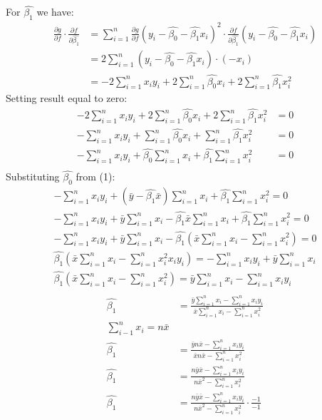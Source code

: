\documentclass{article}
\begin{document}
For $\hat{\beta_1}$ we have:
\begin{align*}
\frac{\partial g}{\partial f}\cdot\frac{\partial f} {\partial \hat{\beta_1}} & = 
\sum_{i=1}^{n} \frac{\partial g}{\partial f} (y_i - \hat{\beta_{0}} - \hat{\beta_{1}}x_i)^2 \cdot \frac{\partial f} {\partial \hat{\beta_1}} (y_i - \hat{\beta_{0}} - \hat{\beta_{1}}x_i) \\
& = 2 \sum_{i=1}^{n} (y_i - \hat{\beta_{0}} - \hat{\beta_{1}}x_i) \cdot 
(-x_i) \\
& =  -2\sum_{i=1}^{n}x_i y_i + 2\sum_{i=1}^{n}\hat{\beta_{0}}x_i + 2\sum_{i=1}^{n}\hat{\beta_{1}}x_i^2
\end{align*}
Setting result equal to zero:
\begin{align*}
-2\sum_{i=1}^{n}x_i y_i + 2\sum_{i=1}^{n}\hat{\beta_{0}}x_i + 2\sum_{i=1}^{n}\hat{\beta_{1}}x_i^2 & = 0 \\
-\sum_{i=1}^{n}x_i y_i + \sum_{i=1}^{n}\hat{\beta_{0}}x_i + \sum_{i=1}^{n}\hat{\beta_{1}}x_i^2 & = 0 \\
-\sum_{i=1}^{n}x_i y_i + \hat{\beta_{0}}\sum_{i=1}^{n}x_i + \hat{\beta_{1}} \sum_{i=1}^{n}x_i^2 & = 0 \\
\end{align*}
Substituting $\hat{\beta_0}$ from (1):
\begin{gather*}
-\sum_{i=1}^{n}x_i y_i + (\bar{y} - \hat{\beta_1}\bar{x})\sum_{i=1}^{n}x_i + \hat{\beta_{1}} \sum_{i=1}^{n}x_i^2  = 0 \\
-\sum_{i=1}^{n}x_i y_i + \bar{y}\sum_{i=1}^{n}x_i - \hat{\beta_1}\bar{x}\sum_{i=1}^{n}x_i + \hat{\beta_{1}} \sum_{i=1}^{n}x_i^2  = 0 \\
-\sum_{i=1}^{n}x_i y_i + \bar{y}\sum_{i=1}^{n}x_i - \hat{\beta_1}(\bar{x}\sum_{i=1}^{n}x_i - \sum_{i=1}^{n}x_i^2)  = 0 \\
\hat{\beta_1}(\bar{x}\sum_{i=1}^{n}x_i - \sum_{i=1}^{n}x_i^2x_i y_i ) = -\sum_{i=1}^{n}x_i y_i  + \bar{y}\sum_{i=1}^{n}x_i \\
\hat{\beta_1}(\bar{x}\sum_{i=1}^{n}x_i - \sum_{i=1}^{n}x_i^2) =  \bar{y}\sum_{i=1}^{n}x_i 
- \sum_{i=1}^{n}x_i y_i \\
\end{gather*}
\begin{align*}
\hat{\beta_1} & =  \frac{\bar{y}\sum_{i=1}^{n}x_i 
- \sum_{i=1}^{n}x_i y_i }{\bar{x}\sum_{i=1}^{n}x_i - \sum_{i=1}^{n}x_i^2}  \\
\sum_{i - 1}^{n}x_i = n\bar{x}\\
\hat{\beta_1} & =  \frac{\bar{y}n\bar{x} 
- \sum_{i=1}^{n}x_i y_i }{\bar{x}n\bar{x} - \sum_{i=1}^{n}x_i^2}  \\
\hat{\beta_1} & =  \frac{n\bar{y}\bar{x} 
- \sum_{i=1}^{n}x_i y_i }{n\bar{x}^2 - \sum_{i=1}^{n}x_i^2} \\
\hat{\beta_1} & =  \frac{n\bar{y}\bar{x} 
- \sum_{i=1}^{n}x_i y_i}{n\bar{x}^2 - \sum_{i=1}^{n}x_i^2} \cdot \frac{-1}{-1 } \\
\end{align*}
\end{document}
